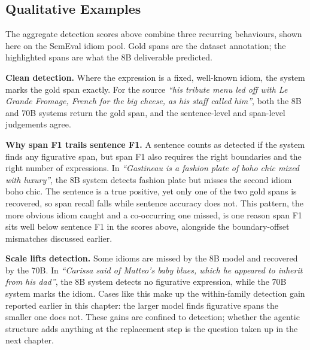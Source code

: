 \subsection{Qualitative Examples}

The aggregate detection scores above combine three recurring behaviours, shown here on the SemEval idiom pool. Gold spans are the dataset annotation; the highlighted spans are what the 8B deliverable predicted.

\textbf{Clean detection.} Where the expression is a fixed, well-known idiom, the system marks the gold span exactly. For the source \textit{``his tribute menu led off with Le Grande Fromage, French for \colorbox{figblue!18}{the big cheese}, as his staff called him''}, both the 8B and 70B systems return the gold span, and the sentence-level and span-level judgements agree.

\textbf{Why span F1 trails sentence F1.} A sentence counts as detected if the system finds any figurative span, but span F1 also requires the right boundaries and the right number of expressions. In \textit{``Gastineau is a \colorbox{figblue!18}{fashion plate} of \colorbox{figorange!22}{boho chic} mixed with luxury''}, the 8B system detects \colorbox{figblue!18}{fashion plate} but misses the second idiom \colorbox{figorange!22}{boho chic}. The sentence is a true positive, yet only one of the two gold spans is recovered, so span recall falls while sentence accuracy does not. This pattern, the more obvious idiom caught and a co-occurring one missed, is one reason span F1 sits well below sentence F1 in the scores above, alongside the boundary-offset mismatches discussed earlier.

\textbf{Scale lifts detection.} Some idioms are missed by the 8B model and recovered by the 70B. In \textit{``Carissa said of Matteo's \colorbox{figorange!22}{baby blues}, which he appeared to inherit from his dad''}, the 8B system detects no figurative expression, while the 70B system marks the idiom. Cases like this make up the within-family detection gain reported earlier in this chapter: the larger model finds figurative spans the smaller one does not. These gains are confined to detection; whether the agentic structure adds anything at the replacement step is the question taken up in the next chapter.

\newpage
